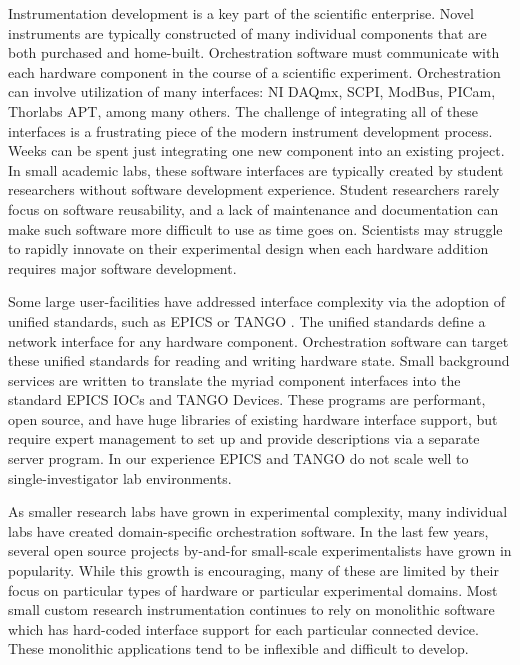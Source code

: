 \documentclass[aip, amsmath, amssymb, reprint,]{revtex4-2}
\begin{document}
Instrumentation development is a key part of the scientific enterprise.
Novel instruments are typically constructed of many individual components that are both purchased and home-built.
Orchestration software must communicate with each hardware component in the course of a scientific experiment.
Orchestration can involve utilization of many interfaces: NI DAQmx\cite{nidaqmx}, SCPI\cite{scpi}, ModBus\cite{modbus}, PICam\cite{picam}, Thorlabs APT\cite{thorlabs_apt}, among many others.
The challenge of integrating all of these interfaces is a frustrating piece of the modern instrument development process.
Weeks can be spent just integrating one new component into an existing project.
In small academic labs, these software interfaces are typically created by student researchers without software development experience.
Student researchers rarely focus on software reusability, and a lack of maintenance and documentation can make such software more difficult to use as time goes on.
Scientists may struggle to rapidly innovate on their experimental design when each hardware addition requires major software development.

Some large user-facilities have addressed interface complexity via the adoption of unified standards, such as EPICS \cite{DalesioLR1991a} or TANGO \cite{AGotz1999TANGOA}.
The unified standards define a network interface for any hardware component.
Orchestration software can target these unified standards for reading and writing hardware state.
Small background services are written to translate the myriad component interfaces into the standard EPICS IOCs and TANGO Devices.
These programs are performant, open source, and have huge libraries of existing hardware interface support, but require expert management to set up and provide descriptions via a separate server program.
In our experience EPICS and TANGO do not scale well to single-investigator lab environments.

As smaller research labs have grown in experimental complexity, many individual labs have created domain-specific orchestration software.
In the last few years, several open source projects by-and-for small-scale experimentalists have grown in popularity\cite{WeberSebastien2021a,Bogdanowicz2022,trspectrometer,Koerner_2019,Campagnola_2014,pymeasure,Giesbrecht_2022,pylablib}.
While this growth is encouraging, many of these are limited by their focus on particular types of hardware or particular experimental domains.
Most small custom research instrumentation continues to rely on monolithic software which has hard-coded interface support for each particular connected device.
These monolithic applications tend to be inflexible and difficult to develop.
\end{document}
